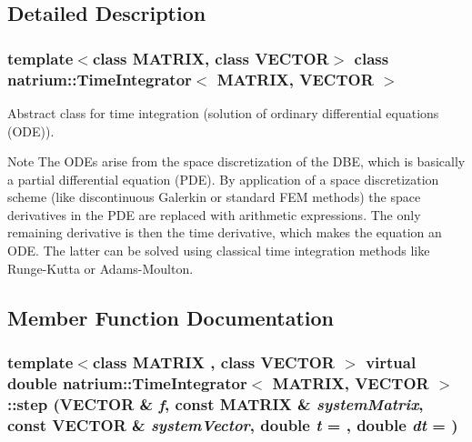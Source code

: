\subsection{Detailed Description}
\subsubsection*{template$<$class MATRIX, class VECTOR$>$ class natrium::TimeIntegrator$<$ MATRIX, VECTOR $>$}

Abstract class for time integration (solution of ordinary differential equations (ODE)). \begin{DoxyNote}{Note}
The ODEs arise from the space discretization of the DBE, which is basically a partial differential equation (PDE). By application of a space discretization scheme (like discontinuous Galerkin or standard FEM methods) the space derivatives in the PDE are replaced with arithmetic expressions. The only remaining derivative is then the time derivative, which makes the equation an ODE. The latter can be solved using classical time integration methods like Runge-\/Kutta or Adams-\/Moulton. 
\end{DoxyNote}


\subsection{Member Function Documentation}
\hypertarget{classnatrium_1_1TimeIntegrator_a1c438e41d183d172d524aa5dc97785fb}{
\subsubsection[{step}]{\setlength{\rightskip}{0pt plus 5cm}template$<$class MATRIX , class VECTOR $>$ virtual double {\bf natrium::TimeIntegrator}$<$ MATRIX, VECTOR $>$::step (VECTOR \& {\em f}, \/  const MATRIX \& {\em systemMatrix}, \/  const VECTOR \& {\em systemVector}, \/  double {\em t} = {}, \/  double {\em dt} = {})}}
\label{classnatrium_1_1TimeIntegrator_a1c438e41d183d172d524aa5dc97785fb}


